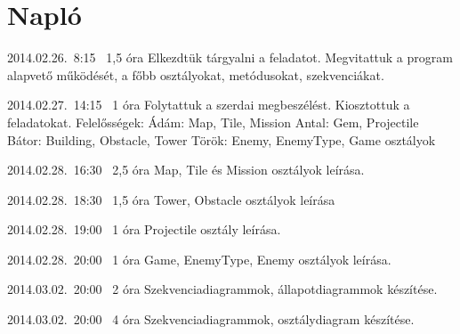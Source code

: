 %
\section{Napló}

\begin{naplo}

\bejegyzes
{2014.02.26.~8:15~} %
{1,5 óra} %
{\vadam\newline
\vantal\newline
\vbator\newline
\vtorok}
{Elkezdtük tárgyalni a feladatot. Megvitattuk a program alapvető működését, a főbb osztályokat, metódusokat, szekvenciákat.}

\bejegyzes
{2014.02.27.~14:15~}
{1 óra}
{\vadam\newline
\vantal\newline
\vbator\newline
\vtorok}
{Folytattuk a szerdai megbeszélést. Kiosztottuk a feladatokat. \newline Felelősségek: \newline
Ádám: Map, Tile, Mission \newline
Antal: Gem, Projectile \newline
Bátor: Building, Obstacle, Tower \newline
Török: Enemy, EnemyType, Game \newline osztályok}

\bejegyzes
{2014.02.28.~16:30~}
{2,5 óra}
{\vadam}
{Map, Tile és Mission osztályok leírása.}

\bejegyzes
{2014.02.28.~18:30~}
{1,5 óra}
{\vbator}
{Tower, Obstacle osztályok leírása}

\bejegyzes
{2014.02.28.~19:00~}
{1 óra}
{\vantal}
{Projectile osztály leírása.}

\bejegyzes
{2014.02.28.~20:00~}
{1 óra}
{\vtorok}
{Game, EnemyType, Enemy osztályok leírása.}

\bejegyzes
{2014.03.02.~20:00~}
{2 óra}
{\vadam}
{Szekvenciadiagrammok, állapotdiagrammok készítése. }

\bejegyzes
{2014.03.02.~20:00~}
{4 óra}
{\vbator}
{Szekvenciadiagrammok, osztálydiagram készítése. }

\end{naplo}

